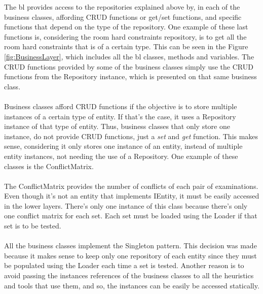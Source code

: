 The \gls{bl} provides access to the repositories explained above by, in each of the business classes, affording CRUD functions or get/set functions, and specific functions that depend on the type of the repository. One example of these last functions is, considering the room hard constraints repository, is to get all the room hard constraints that is of a certain type. This can be seen in the Figure \ref{fig:BusinessLayer}, which includes all the \gls{bl} classes, methods and variables. The CRUD functions provided by some of the business classes simply use the CRUD functions from the Repository instance, which is presented on that same business class.\\
\\
Business classes afford CRUD functions if the objective is to store multiple instances of a certain type of entity. If that's the case, it uses a Repository instance of that type of entity. Thus, business classes that only store one instance, do not provide CRUD functions, just a \textit{set} and \textit{get} function. This makes sense, considering it only stores one instance of an entity, instead of multiple entity instances, not needing the use of a Repository. One example of these classes is the ConflictMatrix. \\
\\
The ConflictMatrix provides the number of conflicts of each pair of examinations. Even though it's not an entity that implements IEntity, it must be easily accessed in the lower layers. There's only one instance of this class because there's only one conflict matrix for each set. Each set must be loaded using the Loader if that set is to be tested.\\
\\
All the business classes implement the Singleton pattern. This decision was made because it makes sense to keep only one repository of each entity since they must be populated using the Loader each time a set is tested. Another reason is to avoid passing the instances references of the business classes to all the heuristics and tools that use them, and so, the instances can be easily be accessed statically.\\

